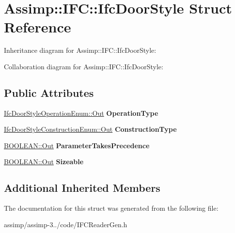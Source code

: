 \hypertarget{struct_assimp_1_1_i_f_c_1_1_ifc_door_style}{\section{Assimp\+:\+:I\+F\+C\+:\+:Ifc\+Door\+Style Struct Reference}
\label{struct_assimp_1_1_i_f_c_1_1_ifc_door_style}
}


Inheritance diagram for Assimp\+:\+:I\+F\+C\+:\+:Ifc\+Door\+Style\+:


Collaboration diagram for Assimp\+:\+:I\+F\+C\+:\+:Ifc\+Door\+Style\+:
\subsection*{Public Attributes}
\begin{DoxyCompactItemize}
\item 
\hypertarget{struct_assimp_1_1_i_f_c_1_1_ifc_door_style_a848427717abc12799a19f3a1d345d1f1}{\hyperlink{classboost_1_1shared__ptr}{Ifc\+Door\+Style\+Operation\+Enum\+::\+Out} {\bfseries Operation\+Type}}\label{struct_assimp_1_1_i_f_c_1_1_ifc_door_style_a848427717abc12799a19f3a1d345d1f1}

\item 
\hypertarget{struct_assimp_1_1_i_f_c_1_1_ifc_door_style_ae6dc58669cd09e9b5978d903e5e64e68}{\hyperlink{classboost_1_1shared__ptr}{Ifc\+Door\+Style\+Construction\+Enum\+::\+Out} {\bfseries Construction\+Type}}\label{struct_assimp_1_1_i_f_c_1_1_ifc_door_style_ae6dc58669cd09e9b5978d903e5e64e68}

\item 
\hypertarget{struct_assimp_1_1_i_f_c_1_1_ifc_door_style_aafae6584b9859d7aa1bab9f0e239db41}{\hyperlink{classboost_1_1shared__ptr}{B\+O\+O\+L\+E\+A\+N\+::\+Out} {\bfseries Parameter\+Takes\+Precedence}}\label{struct_assimp_1_1_i_f_c_1_1_ifc_door_style_aafae6584b9859d7aa1bab9f0e239db41}

\item 
\hypertarget{struct_assimp_1_1_i_f_c_1_1_ifc_door_style_abb6cf55ce5f8e7c2a4ff773188d6c17e}{\hyperlink{classboost_1_1shared__ptr}{B\+O\+O\+L\+E\+A\+N\+::\+Out} {\bfseries Sizeable}}\label{struct_assimp_1_1_i_f_c_1_1_ifc_door_style_abb6cf55ce5f8e7c2a4ff773188d6c17e}

\end{DoxyCompactItemize}
\subsection*{Additional Inherited Members}


The documentation for this struct was generated from the following file\+:\begin{DoxyCompactItemize}
\item 
assimp/assimp-\/3../code/I\+F\+C\+Reader\+Gen.\+h\end{DoxyCompactItemize}
